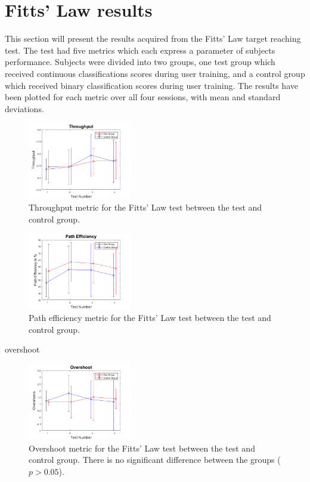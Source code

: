 
\section{Fitts' Law results} \label{sec:R:fitts}
This section will present the results acquired from the Fitts' Law target reaching test. The test had five metrics which each express a parameter of subjects performance. Subjects were divided into two groups, one test group which received continuous classifications scores during user training, and a control group which received binary classification scores during user training. The results have been plotted for each metric over all four sessions, with mean and standard deviations.

\begin{figure}[H] 
	\includegraphics[width=0.4\textwidth]{figures/xWesulds/Throughput}
	\caption{Throughput metric for the Fitts' Law test between the test and control group.}
	\label{fig:TPresult}
\end{figure}

\begin{figure}[H] 
	\includegraphics[width=0.4\textwidth]{figures/xWesulds/PathEfficiency}
	\caption{Path efficiency metric for the Fitts' Law test between the test and control group.}
	\label{fig:PEresult}
\end{figure} 

overshoot
\begin{figure}[H] 
	\includegraphics[width=0.4\textwidth]{figures/xWesulds/Overshoot}
	\caption{Overshoot metric for the Fitts' Law test between the test and control group. There is no significant difference between the groups ($p > 0.05$).}
	\label{fig:OSresult}
\end{figure} 

